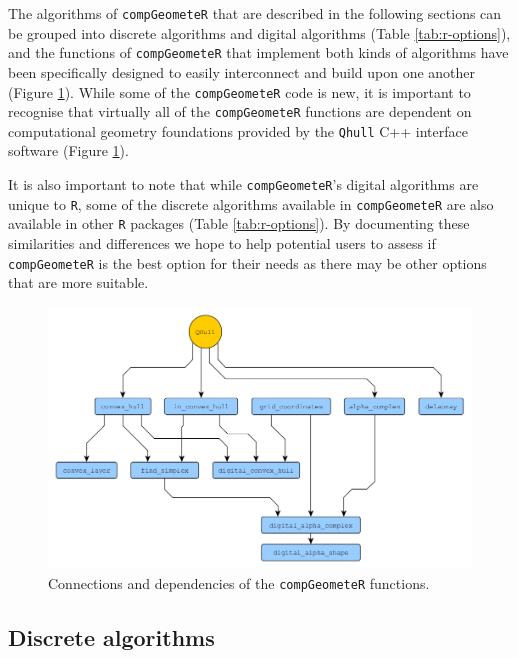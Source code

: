 \documentclass[12pt, a4paper]{article}
\begin{document}
The algorithms of \texttt{compGeometeR} that are described in the following sections can be grouped into discrete algorithms and digital algorithms (Table \ref{tab:r-options}), and the functions of \texttt{compGeometeR} that implement both kinds of algorithms have been specifically designed to easily interconnect and build upon one another (Figure \ref{fig:software-structure}).  While some of the \texttt{compGeometeR} code is new, it is important to recognise that virtually all of the \texttt{compGeometeR} functions are  dependent on computational geometry foundations provided by the \texttt{Qhull} C++ interface software \citep[\url{http://www.qhull.org/}]{barber-1996} (Figure \ref{fig:software-structure}).

It is also important to note that while \texttt{compGeometeR}'s digital algorithms are unique to \texttt{R}, some of the discrete algorithms available in \texttt{compGeometeR} are also available in other \texttt{R} packages (Table \ref{tab:r-options}).  By documenting these similarities and differences we hope to help potential users to assess if \texttt{compGeometeR} is the best option for their needs as there may be other options that are more suitable.

\begin{figure}[t]
\centering
\includegraphics[width=15cm]{figures/software-structure/software-structure.png}
\caption{Connections and dependencies of the \texttt{compGeometeR} functions.}
\label{fig:software-structure}
\end{figure}

\subsection{Discrete algorithms}
\end{document}
